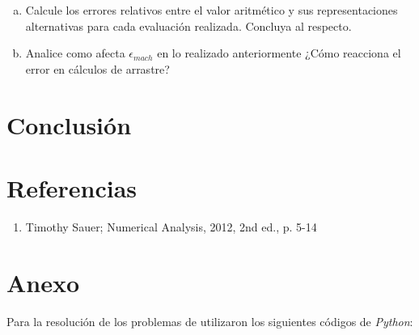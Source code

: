\documentclass[10pt]{article}
\begin{document}
\begin{enumerate}[a)]
\item Calcule los errores relativos entre el valor aritmético y sus representaciones alternativas para cada evaluación realizada. Concluya al respecto.

\item Analice como afecta $\epsilon_{mach}$ en lo realizado anteriormente ¿Cómo reacciona el error en cálculos de arrastre?

\end{enumerate}

\section{Conclusión}

\section{Referencias}
\begin{enumerate}
\item Timothy Sauer; Numerical Analysis, 2012, 2nd ed., p. 5-14
\end{enumerate}

\section{Anexo}
Para la resolución de los problemas de utilizaron los siguientes códigos de  \textit{Python}:
\end{document}
